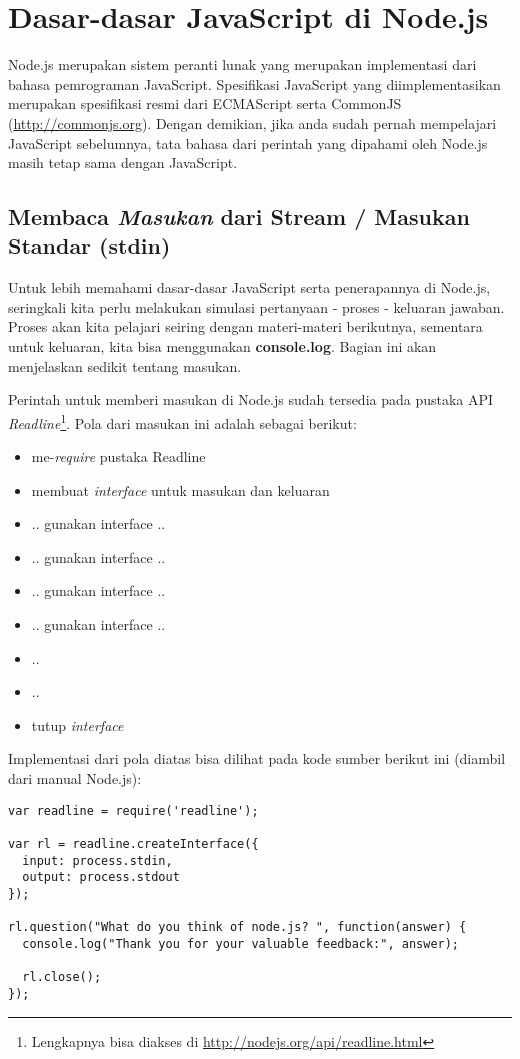 \section{Dasar-dasar JavaScript di Node.js}

Node.js merupakan sistem peranti lunak yang merupakan implementasi dari bahasa pemrograman JavaScript. Spesifikasi JavaScript yang diimplementasikan merupakan spesifikasi resmi dari ECMAScript serta CommonJS (\url{http://commonjs.org}). Dengan demikian, jika anda sudah pernah mempelajari JavaScript sebelumnya, tata bahasa dari perintah yang dipahami oleh Node.js masih tetap sama dengan JavaScript. 

\subsection{Membaca \textit{Masukan} dari Stream / Masukan Standar (stdin)}

Untuk lebih memahami dasar-dasar JavaScript serta penerapannya di Node.js, seringkali kita perlu melakukan simulasi pertanyaan - proses - keluaran jawaban. Proses akan kita pelajari seiring dengan materi-materi berikutnya, sementara untuk keluaran, kita bisa menggunakan \textbf{console.log}. Bagian ini akan menjelaskan sedikit tentang masukan.

Perintah untuk memberi masukan di Node.js sudah tersedia pada pustaka API \textit{Readline}\footnote{Lengkapnya bisa diakses di \url{http://nodejs.org/api/readline.html}}. Pola dari masukan ini adalah sebagai berikut:
\begin{itemize}
  \item me-\textit{require} pustaka Readline
  \item membuat \textit{interface} untuk masukan dan keluaran
  \item .. gunakan interface ..
  \item .. gunakan interface ..
  \item .. gunakan interface ..
  \item .. gunakan interface ..
  \item ..
  \item ..
  \item tutup \textit{interface}
\end{itemize}

Implementasi dari pola diatas bisa dilihat pada kode sumber berikut ini (diambil dari manual Node.js):

\lstset{language=JavaScript,caption=readline.js: penggunaan pustaka Readline untuk masukan}
\begin{lstlisting}
var readline = require('readline');

var rl = readline.createInterface({
  input: process.stdin,
  output: process.stdout
});

rl.question("What do you think of node.js? ", function(answer) {
  console.log("Thank you for your valuable feedback:", answer);

  rl.close();
});
\end{lstlisting}

